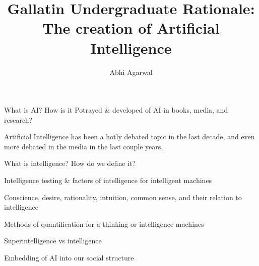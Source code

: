 \documentclass[11pt]{article}
\title{Gallatin Undergraduate Rationale: The creation of Artificial Intelligence}
\author{Abhi Agarwal}
\date{}
\begin{document}
\maketitle


{\large What is AI? How is it Potrayed \& developed of AI in books, media, and research?\par}

\par Artificial Intelligence has been a hotly debated topic in the last decade, and even more debated in the media in the last couple years. 

\par What is intelligence? How do we define it?\\

{\large Intelligence testing \& factors of intelligence for intelligent machines\par}

{\large Conscience, desire, rationality, intuition, common sense, and their relation to intelligence\par}

{\large Methods of quantification for a thinking or intelligence machines\par}

{\large Superintelligence vs intelligence\par}

{\large Embedding of AI into our social structure\par}
\end{document}
